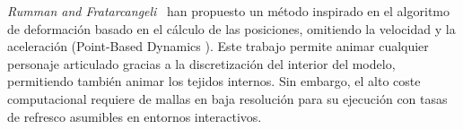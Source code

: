 \emph{Rumman and Fratarcangeli}~\cite{abu2015position} han propuesto un método inspirado en el algoritmo de deformación basado en el cálculo de las posiciones, omitiendo la velocidad y la aceleración (Point-Based Dynamics \cite{Bender:2014}). Este trabajo permite animar cualquier personaje articulado gracias a la discretización del interior del modelo, permitiendo también animar los tejidos internos. Sin embargo, el alto coste computacional requiere de mallas en baja resolución para su ejecución con tasas de refresco asumibles en entornos interactivos.%

